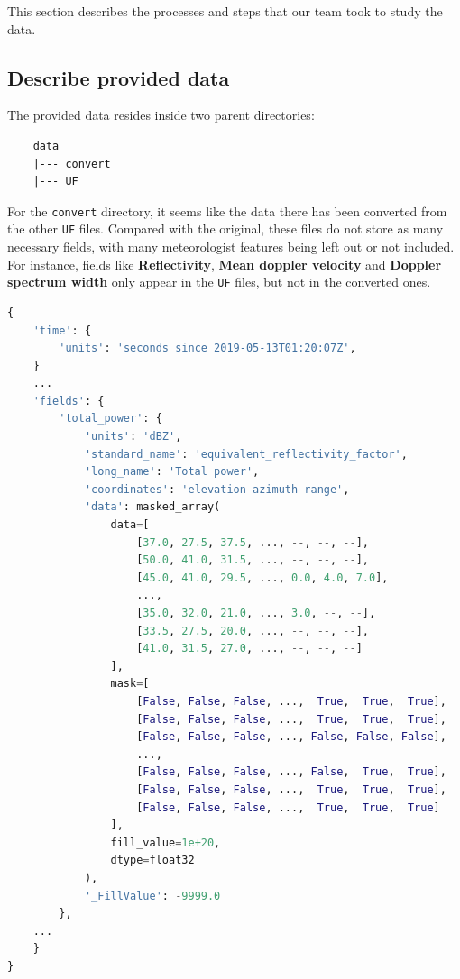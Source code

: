 This section describes the processes and steps that our team took to study the data.

\subsection{Describe provided data}

The provided data resides inside two parent directories:

\begin{verbatim}
    data
    |--- convert
    |--- UF
\end{verbatim}

For the \texttt{convert} directory, it seems like the data there has been converted from the other \texttt{UF} files.
Compared with the original, these files do not store as many necessary fields,
with many meteorologist features being left out or not included.
For instance, fields like \textbf{Reflectivity}, \textbf{Mean doppler velocity} and \textbf{Doppler spectrum width} only appear
in the \texttt{UF} files, but not in the converted ones.

\begin{lstlisting}[language=python,caption={A sample of metadata extracted from UF file}]
{
    'time': {
        'units': 'seconds since 2019-05-13T01:20:07Z',
    }
    ...
    'fields': {
        'total_power': {
            'units': 'dBZ',
            'standard_name': 'equivalent_reflectivity_factor',
            'long_name': 'Total power',
            'coordinates': 'elevation azimuth range',
            'data': masked_array(
                data=[
                    [37.0, 27.5, 37.5, ..., --, --, --],
                    [50.0, 41.0, 31.5, ..., --, --, --],
                    [45.0, 41.0, 29.5, ..., 0.0, 4.0, 7.0],
                    ...,
                    [35.0, 32.0, 21.0, ..., 3.0, --, --],
                    [33.5, 27.5, 20.0, ..., --, --, --],
                    [41.0, 31.5, 27.0, ..., --, --, --]
                ],
                mask=[
                    [False, False, False, ...,  True,  True,  True],
                    [False, False, False, ...,  True,  True,  True],
                    [False, False, False, ..., False, False, False],
                    ...,
                    [False, False, False, ..., False,  True,  True],
                    [False, False, False, ...,  True,  True,  True],
                    [False, False, False, ...,  True,  True,  True]
                ],
                fill_value=1e+20,
                dtype=float32
            ),
            '_FillValue': -9999.0
        },
    ...
    }
}
\end{lstlisting}


